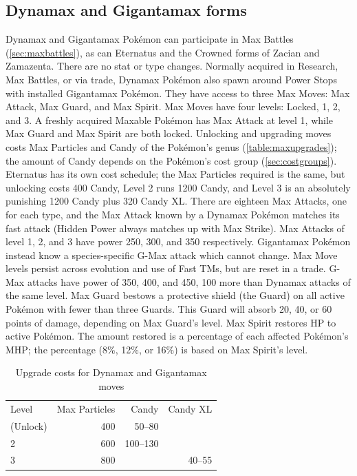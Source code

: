 \subsection{Dynamax and Gigantamax forms\label{sec:dmaxgmax}}
Dynamax and Gigantamax Pokémon can participate in Max Battles (\autoref{sec:maxbattles}),
 as can Eternatus and the Crowned forms of Zacian and Zamazenta.
There are no stat or type changes.
Normally acquired in Research, Max Battles, or via trade,
 Dynamax Pokémon also spawn around Power Stops with installed Gigantamax Pokémon.
They have access to three Max Moves: Max Attack, Max Guard, and Max Spirit.
Max Moves have four levels: Locked, 1, 2, and 3.
A freshly acquired Maxable Pokémon has Max Attack at level 1, while Max Guard and Max Spirit are both locked.
Unlocking and upgrading moves costs Max Particles and Candy of the Pokémon's genus (\autoref{table:maxupgrades});
 the amount of Candy depends on the Pokémon's cost group (\autoref{sec:costgroups}).
Eternatus has its own cost schedule; the Max Particles required is the same,
 but unlocking costs 400 Candy, Level 2 runs 1200 Candy, and
 Level 3 is an absolutely punishing 1200 Candy plus 320 Candy XL.
There are eighteen Max Attacks, one for each type, and the Max Attack known by a Dynamax Pokémon matches its fast attack
 (Hidden Power always matches up with Max Strike).
Max Attacks of level 1, 2, and 3 have power 250, 300, and 350 respectively.
Gigantamax Pokémon instead know a species-specific G-Max attack which cannot change.
Max Move levels persist across evolution and use of Fast TMs, but are reset in a trade.
G-Max attacks have power of 350, 400, and 450, 100 more than Dynamax attacks of the same level.
Max Guard bestows a protective shield (the Guard) on all active Pokémon
  with fewer than three Guards.
This Guard will absorb 20, 40, or 60 points of damage, depending on Max Guard's level.
Max Spirit restores HP to active Pokémon.
The amount restored is a percentage of each affected Pokémon's MHP\@;
  the percentage (8\%, 12\%, or 16\%) is based on Max Spirit's level.
\begin{table}[b]
\centering
\begin{tabular}{lrrr}
Level & Max Particles & Candy & Candy XL\\
\Midrule
1 (Unlock) & 400 & 50--80 &\\
2          & 600 & 100--130 &\\
3          & 800 & & 40--55\\
\end{tabular}
\caption{Upgrade costs for Dynamax and Gigantamax moves\label{table:maxupgrades}}
\end{table}

